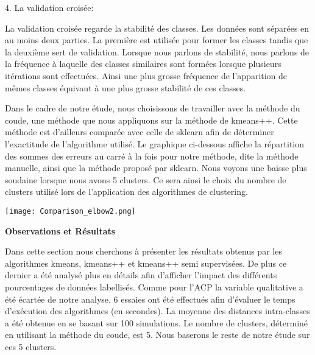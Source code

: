 \documentclass[ ]{article}
\begin{document}
\begin{description}
 	 \item 4. La validation croisée:
 	 
La validation croisée regarde la stabilité des classes. Les données sont séparées en au moins deux parties. La première est utilisée pour former les classes tandis que la deuxième sert de validation. Lorsque nous parlons de stabilité, nous parlons de la fréquence à laquelle des classes similaires sont formées lorsque plusieurs itérations sont effectuées. Ainsi une plus grosse fréquence de l’apparition de mêmes classes équivaut à une plus grosse stabilité de ces classes.
 	 
\end{description}

\noindent
Dans le cadre de notre étude, nous choisissons de travailler avec la méthode du coude, une méthode que nous appliquons sur la méthode de kmeans++. Cette méthode est d'ailleurs comparée avec celle de sklearn afin de déterminer l'exactitude de l'algorithme utilisé. Le graphique ci-dessous affiche la répartition des sommes des erreurs au carré à la fois pour notre méthode, dite la méthode manuelle, ainsi que la méthode proposé par sklearn. Nous voyons une baisse plus soudaine lorsque nous avons 5 clusters. Ce sera ainsi le choix du nombre de clusters utilisé lors de l'application des algorithmes de clustering.

\begin{center}
\texttt{[image: Comparison\_elbow2.png]}
\end{center}

\vspace{10 mm}
\noindent
\begin{large}
\textbf{Observations et Résultats}
\end{large}
\vspace{10 mm}

\noindent
Dans cette section nous cherchons à présenter les résultats obtenus par les algorithmes kmeans, kmeans++ et kmeans++ semi supervisées. De plus ce dernier a été analysé plus en détails afin d'afficher l'impact des différents pourcentages de données labellisés. Comme pour l'ACP la variable qualitative a été écartée de notre analyse.
6 essaies ont été effectués afin d'évaluer le temps d'exécution des algorithmes (en secondes). La moyenne des distances intra-classes a été obtenue en se basant sur 100 simulations. Le nombre de clusters, déterminé en utilisant la méthode du coude, est 5. Nous baserons le reste de notre étude sur ces 5 clusters.
\end{document}
